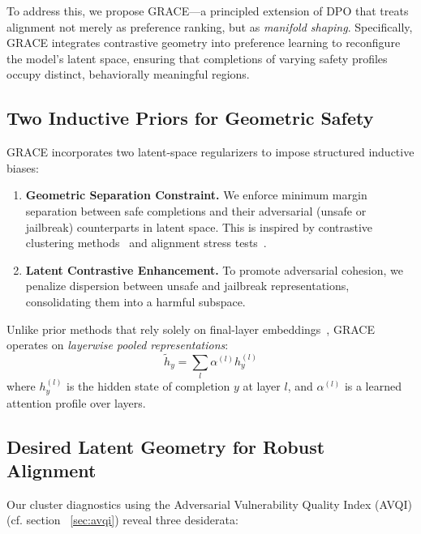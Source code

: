 To address this, we propose \textsc{GRACE}—a principled extension of DPO that treats alignment not merely as preference ranking, but as \emph{manifold shaping}. Specifically, \textsc{GRACE} integrates contrastive geometry into preference learning to reconfigure the model’s latent space, ensuring that completions of varying safety profiles occupy distinct, behaviorally meaningful regions.

\vspace{1mm}
\subsection{Two Inductive Priors for Geometric Safety}

\textsc{GRACE} incorporates two latent-space regularizers to impose structured inductive biases:

\begin{enumerate}[leftmargin=1.5em]
    \item \textbf{Geometric Separation Constraint.} We enforce minimum margin separation between safe completions and their adversarial (unsafe or jailbreak) counterparts in latent space. This is inspired by contrastive clustering methods~\cite{khosla2020supervised} and alignment stress tests~\cite{carlini2023extracting}.
    
    \item \textbf{Latent Contrastive Enhancement.} To promote adversarial cohesion, we penalize dispersion between unsafe and jailbreak representations, consolidating them into a harmful subspace.
\end{enumerate}

Unlike prior methods that rely solely on final-layer embeddings~\cite{belrose2023language, mu2023layers}, \textsc{GRACE} operates on \emph{layerwise pooled representations}:
\[
\tilde{h}_y = \sum_l \alpha^{(l)} h_y^{(l)}
\]
where \( h_y^{(l)} \) is the hidden state of completion \( y \) at layer \( l \), and \( \alpha^{(l)} \) is a learned attention profile over layers.

\vspace{1mm}
\subsection{Desired Latent Geometry for Robust Alignment}

Our cluster diagnostics using the Adversarial Vulnerability Quality Index (AVQI) (cf. section ~\ref{sec:avqi}) reveal three desiderata:

